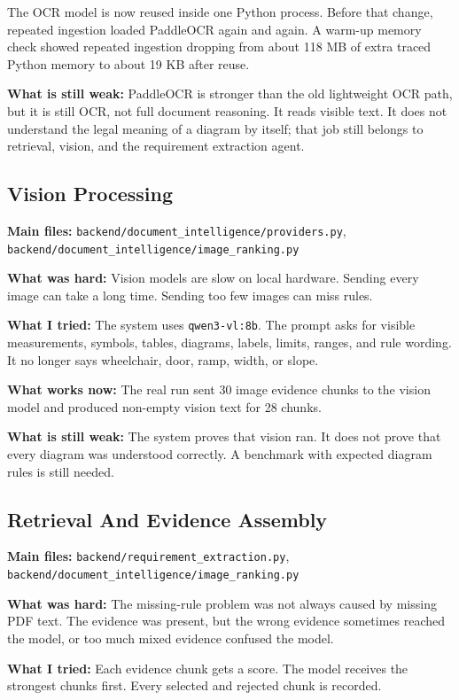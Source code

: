 \documentclass[11pt,a4paper]{article}
\begin{document}
The OCR model is now reused inside one Python process. Before that change, repeated ingestion loaded PaddleOCR again and again. A warm-up memory check showed repeated ingestion dropping from about 118 MB of extra traced Python memory to about 19 KB after reuse.

\textbf{What is still weak:}
PaddleOCR is stronger than the old lightweight OCR path, but it is still OCR, not full document reasoning. It reads visible text. It does not understand the legal meaning of a diagram by itself; that job still belongs to retrieval, vision, and the requirement extraction agent.

\subsection{Vision Processing}
\textbf{Main files:} \texttt{backend/document\_intelligence/providers.py}, \texttt{backend/document\_intelligence/image\_ranking.py}

\textbf{What was hard:}
Vision models are slow on local hardware. Sending every image can take a long time. Sending too few images can miss rules.

\textbf{What I tried:}
The system uses \texttt{qwen3-vl:8b}. The prompt asks for visible measurements, symbols, tables, diagrams, labels, limits, ranges, and rule wording. It no longer says wheelchair, door, ramp, width, or slope.

\textbf{What works now:}
The real run sent 30 image evidence chunks to the vision model and produced non-empty vision text for 28 chunks.

\textbf{What is still weak:}
The system proves that vision ran. It does not prove that every diagram was understood correctly. A benchmark with expected diagram rules is still needed.

\subsection{Retrieval And Evidence Assembly}
\textbf{Main files:} \texttt{backend/requirement\_extraction.py}, \texttt{backend/document\_intelligence/image\_ranking.py}

\textbf{What was hard:}
The missing-rule problem was not always caused by missing PDF text. The evidence was present, but the wrong evidence sometimes reached the model, or too much mixed evidence confused the model.

\textbf{What I tried:}
Each evidence chunk gets a score. The model receives the strongest chunks first. Every selected and rejected chunk is recorded.
\end{document}
